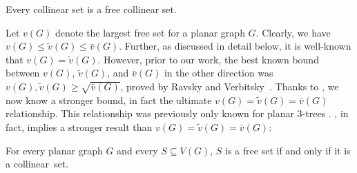 \begin{thm}
Every collinear set is a free collinear set. 
\end{thm}

Let $v(G)$ denote the largest free set for a planar graph $G$. Clearly, we have $v(G)\leq \tilde{v}(G) \leq \bar{v}(G)$. Further, as discussed in detail below, it is well-known that $v(G)=\tilde{v}(G)$. However, prior to our work, the best known bound between $v(G)$,
$\tilde{v}(G)$, and $\bar{v}(G)$ in the other direction was $v(G),\tilde{v}(G) \geq \sqrt{\bar{v}(G)}$, proved by Ravsky and Verbitsky~\cite{ravsky.verbitsky:on}. 
Thanks to , we now know a stronger bound, in fact the ultimate $v(G)=
\tilde{v}(G) = \bar{v}(G)$ relationship. This relationship was
previously only known for planar $3$-trees
\cite{dalozzo.dujmovic.ea:drawing}. , in fact, implies a stronger result than $v(G)= \tilde{v}(G) = \bar{v}(G)$:








\begin{cor}
For every planar graph $G$ and every $S\subseteq V(G)$, $S$ is a free set if
and only if it is a \mbox{collinear set}.
\end{cor}

